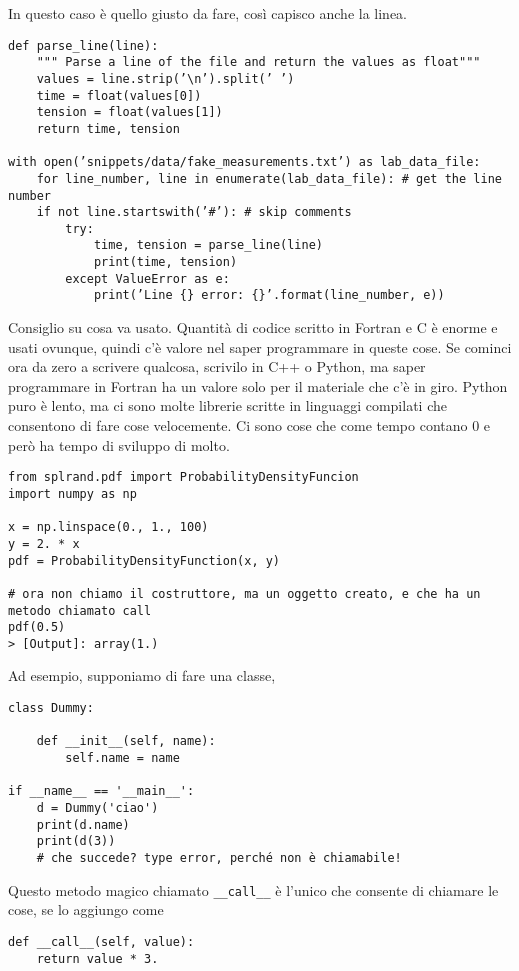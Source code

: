 \documentclass[10pt, a4paper, titlepage]{book}
\begin{document}
In questo caso è quello giusto da fare, così capisco anche la linea.

\begin{verbatim}
def parse_line(line):
	""" Parse a line of the file and return the values as float"""
	values = line.strip(’\n’).split(’ ’)
	time = float(values[0])
	tension = float(values[1])
	return time, tension

with open(’snippets/data/fake_measurements.txt’) as lab_data_file:
	for line_number, line in enumerate(lab_data_file): # get the line number
	if not line.startswith(’#’): # skip comments
		try:
			time, tension = parse_line(line)
			print(time, tension)
		except ValueError as e:
			print(’Line {} error: {}’.format(line_number, e))
\end{verbatim}

Consiglio su cosa va usato. Quantità di codice scritto in Fortran e C è enorme e usati ovunque, quindi c'è valore nel saper programmare in queste cose. Se cominci ora da zero a scrivere qualcosa, scrivilo in C++ o Python, ma saper programmare in Fortran ha un valore solo per il materiale che c'è in giro.
Python puro è lento, ma ci sono molte librerie scritte in linguaggi compilati che consentono di fare cose velocemente. Ci sono cose che come tempo contano 0 e però ha tempo di sviluppo di molto.

\begin{verbatim}
from splrand.pdf import ProbabilityDensityFuncion
import numpy as np

x = np.linspace(0., 1., 100)
y = 2. * x
pdf = ProbabilityDensityFunction(x, y)

# ora non chiamo il costruttore, ma un oggetto creato, e che ha un metodo chiamato call
pdf(0.5)
> [Output]: array(1.)
\end{verbatim}

Ad esempio, supponiamo di fare una classe, 

\begin{verbatim}
class Dummy:

	def __init__(self, name):
		self.name = name

if __name__ == '__main__':
	d = Dummy('ciao')
	print(d.name)
	print(d(3))
	# che succede? type error, perché non è chiamabile!
\end{verbatim}

Questo metodo magico chiamato \texttt{__call__} è l'unico che consente di chiamare le cose, se lo aggiungo come 

\begin{verbatim}
def __call__(self, value):
	return value * 3.
\end{verbatim}
\end{document}
